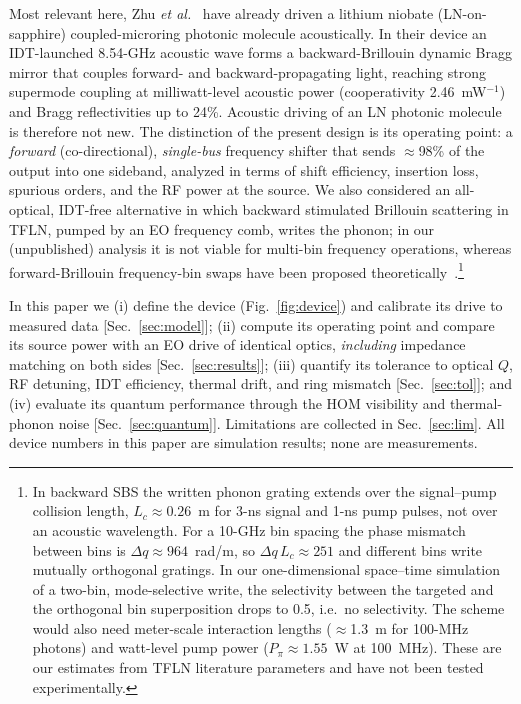 \documentclass[aps,prapplied,reprint,superscriptaddress,amsmath,amssymb,floatfix]{revtex4-2}
\begin{document}
Most relevant here, Zhu \emph{et al.}~\cite{Zhu2025ao} have already driven a lithium niobate (LN-on-sapphire) coupled-microring photonic molecule acoustically. In their device an IDT-launched 8.54-GHz acoustic wave forms a backward-Brillouin dynamic Bragg mirror that couples forward- and backward-propagating light, reaching strong supermode coupling at milliwatt-level acoustic power (cooperativity 2.46~mW$^{-1}$) and Bragg reflectivities up to 24\%. Acoustic driving of an LN photonic molecule is therefore not new. The distinction of the present design is its operating point: a \emph{forward} (co-directional), \emph{single-bus} frequency shifter that sends $\approx$98\% of the output into one sideband, analyzed in terms of shift efficiency, insertion loss, spurious orders, and the RF power at the source. We also considered an all-optical, IDT-free alternative in which backward stimulated Brillouin scattering in TFLN, pumped by an EO frequency comb, writes the phonon; in our (unpublished) analysis it is not viable for multi-bin frequency operations, whereas forward-Brillouin frequency-bin swaps have been proposed theoretically~\cite{ShepherdBehunin2025}.\footnote{In backward SBS the written phonon grating extends over the signal--pump collision length, $L_c\approx0.26$~m for 3-ns signal and 1-ns pump pulses, not over an acoustic wavelength. For a 10-GHz bin spacing the phase mismatch between bins is $\Delta q\approx964$~rad/m, so $\Delta q\,L_c\approx251$ and different bins write mutually orthogonal gratings. In our one-dimensional space--time simulation of a two-bin, mode-selective write, the selectivity between the targeted and the orthogonal bin superposition drops to 0.5, i.e.\ no selectivity. The scheme would also need meter-scale interaction lengths ($\approx$1.3~m for 100-MHz photons) and watt-level pump power ($P_\pi\approx1.55$~W at 100~MHz). These are our estimates from TFLN literature parameters and have not been tested experimentally.}

In this paper we (i) define the device (Fig.~\ref{fig:device}) and calibrate its drive to measured data [Sec.~\ref{sec:model}]; (ii) compute its operating point and compare its source power with an EO drive of identical optics, \emph{including} impedance matching on both sides [Sec.~\ref{sec:results}]; (iii) quantify its tolerance to optical $Q$, RF detuning, IDT efficiency, thermal drift, and ring mismatch [Sec.~\ref{sec:tol}]; and (iv) evaluate its quantum performance through the HOM visibility and thermal-phonon noise [Sec.~\ref{sec:quantum}]. Limitations are collected in Sec.~\ref{sec:lim}. All device numbers in this paper are simulation results; none are measurements.
\end{document}
